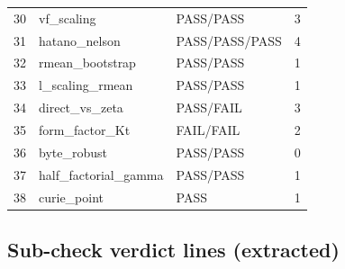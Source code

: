 \documentclass[10pt]{article}
\begin{document}
\begin{table}[htbp]
\begin{tabular}{llll}
30 & vf\_scaling & PASS/PASS & 3 \\
31 & hatano\_nelson & PASS/PASS/PASS & 4 \\
32 & rmean\_bootstrap & PASS/PASS & 1 \\
33 & l\_scaling\_rmean & PASS/PASS & 1 \\
34 & direct\_vs\_zeta & PASS/FAIL & 3 \\
35 & form\_factor\_Kt & FAIL/FAIL & 2 \\
36 & byte\_robust & PASS/PASS & 0 \\
37 & half\_factorial\_gamma & PASS/PASS & 1 \\
38 & curie\_point & PASS & 1 \\
\bottomrule
\end{tabular}
\end{table}

\subsection{Sub-check verdict lines (extracted)}
\end{document}
